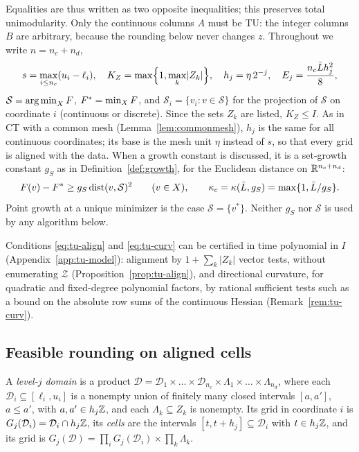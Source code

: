 Equalities are thus written as two opposite inequalities; this preserves
total unimodularity. Only the continuous columns $A$ must be TU: the integer
columns $B$ are arbitrary, because the rounding below never changes $z$.
Throughout we write $n=n_c+n_d$,
\[
s=\max_{i\le n_c}(u_i-\ell_i),\quad K_Z=\max\Bigl\{1,\max_k\lvert Z_k\rvert\Bigr\},\quad
h_j=\eta\,2^{-j},\quad E_j=\frac{n_c\bar L h_j^2}{8},
\]
$\mathcal S=\operatorname*{arg\,min}_XF$, $F^{*}=\min_XF$, and
$\mathcal S_i=\{v_i:v\in\mathcal S\}$ for the projection of $\mathcal S$ on
coordinate $i$ (continuous or discrete). Since the sets $Z_k$ are listed,
$K_Z\le I$. As in CT with a common mesh (Lemma~\ref{lem:commonmesh}), $h_j$
is the same for all continuous coordinates; its base is the mesh unit $\eta$
instead of $s$, so that every grid is aligned with the data. When a growth
constant is discussed, it is a
set-growth constant $g_S$ as in Definition~\ref{def:growth}, for the
Euclidean distance on $\mathbb R^{n_c+n_d}$:
\begin{equation}\label{eq:tu-setgrowth}
F(v)-F^{*}\ge g_S\operatorname{dist}(v,\mathcal S)^2\qquad(v\in X),\qquad
\kappa_c=\kappa(\bar L,g_S)=\max\{1,\bar L/g_S\}.
\end{equation}
Point growth at a unique minimizer is the case $\mathcal S=\{v^*\}$. Neither
$g_S$ nor $\mathcal S$ is used by any algorithm below.

Conditions \eqref{eq:tu-align} and \eqref{eq:tu-curv} can be certified in
time polynomial in $I$ (Appendix~\ref{app:tu-model}): alignment by
$1+\sum_k\lvert Z_k\rvert$ vector tests, without enumerating $\mathcal Z$
(Proposition~\ref{prop:tu-align}), and directional curvature, for quadratic
and fixed-degree polynomial factors, by rational sufficient tests such as a
bound on the absolute row sums of the continuous Hessian
(Remark~\ref{rem:tu-curv}).

\subsection{Feasible rounding on aligned cells}\label{sec:tu-rounding}

\begin{definition}\label{def:tu-domain}
A \emph{level-$j$ domain} is a product
$\mathcal D=\mathcal D_1\times\dots\times\mathcal D_{n_c}\times\Lambda_1\times\dots\times\Lambda_{n_d}$,
where each $\mathcal D_i\subseteq[\ell_i,u_i]$ is a nonempty union of finitely
many closed intervals $[a,a']$, $a\le a'$, with $a,a'\in h_j\mathbb Z$, and each
$\Lambda_k\subseteq Z_k$ is nonempty. Its grid in coordinate $i$ is
$G_j(\mathcal D_i)=\mathcal D_i\cap h_j\mathbb Z$, its \emph{cells} are the intervals
$[t,t+h_j]\subseteq\mathcal D_i$ with $t\in h_j\mathbb Z$, and its grid is
$G_j(\mathcal D)=\prod_iG_j(\mathcal D_i)\times\prod_k\Lambda_k$.
\end{definition}

